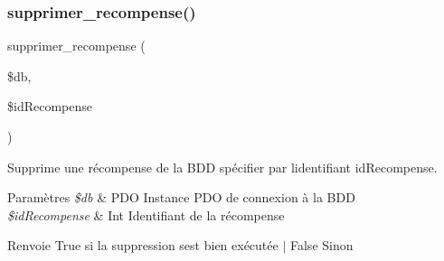 \subsubsection{\texorpdfstring{supprimer\+\_\+recompense()}{supprimer\_recompense()}}
{\footnotesize\ttfamily supprimer\+\_\+recompense (\begin{DoxyParamCaption}\item[{}]{\$db,  }\item[{}]{\$id\+Recompense }\end{DoxyParamCaption})}



Supprime une récompense de la B\+DD spécifier par l\textquotesingle{}identifiant \textquotesingle{}id\+Recompense\textquotesingle{}. 


\begin{DoxyParams}{Paramètres}
{\em \$db} & P\+DO Instance P\+DO de connexion à la B\+DD \\
\hline
{\em \$id\+Recompense} & Int Identifiant de la récompense \\
\hline
\end{DoxyParams}
\begin{DoxyReturn}{Renvoie}
True si la suppression s\textquotesingle{}est bien exécutée $\vert$ False Sinon 
\end{DoxyReturn}
